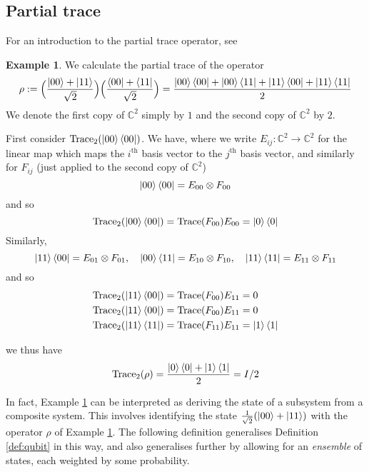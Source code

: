 \documentclass[12pt]{article}
\theoremstyle{plain}
\theoremstyle{definition}
\newtheorem{example}[thm]{Example}
\newcommand{\bb}[1]{\mathbb{#1}}
\newcommand{\lto}{\longrightarrow}
\begin{document}
	\subsection{Partial trace}
	For an introduction to the partial trace operator, see \cite{CommutativeAlgebra}
	\begin{example}\label{ex:Bell_operator}
		We calculate the partial trace of the operator
		\begin{equation}
			\rho := \Big(\frac{\ket{00} + \ket{11}}{\sqrt{2}}\Big)\Big(\frac{\bra{00} + \bra{11}}{\sqrt{2}}\Big) = \frac{\ket{00}\bra{00} + \ket{00}\bra{11} + \ket{11}\bra{00} + \ket{11}\bra{11}}{2}
		\end{equation}
		We denote the first copy of $\bb{C}^2$ simply by $1$ and the second copy of $\bb{C}^2$ by $2$.
		
		First consider $\operatorname{Trace}_2(\ket{00}\bra{00})$. We have, where we write $E_{ij}: \bb{C}^2 \lto \bb{C}^2$ for the linear map which maps the $i^{\text{th}}$ basis vector to the $j^{\text{th}}$ basis vector, and similarly for $F_{ij}$ (just applied to the second copy of $\bb{C}^2$)
		\begin{equation}
			\ket{00}\bra{00} = E_{00} \otimes F_{00}
		\end{equation}
		and so
		\begin{equation}
			\operatorname{Trace}_2(\ket{00}\bra{00}) = \operatorname{Trace}(F_{00})E_{00} = \ket{0}\bra{0}
		\end{equation}
		Similarly,
		\begin{equation}
			\ket{11}\bra{00} = E_{01}\otimes F_{01},\quad \ket{00}\bra{11} = E_{10} \otimes F_{10},\quad \ket{11}\bra{11} = E_{11} \otimes F_{11}
		\end{equation}
		and so
		\begin{align}
			\operatorname{Trace}_2(\ket{11}\bra{00}) = \operatorname{Trace}(F_{00})E_{11} &= 0\\
			\operatorname{Trace}_2(\ket{11}\bra{00}) = \operatorname{Trace}(F_{00})E_{11} &= 0\\
			\operatorname{Trace}_2(\ket{11}\bra{11}) = \operatorname{Trace}(F_{11})E_{11} &= \ket{1}\bra{1}
		\end{align}
	\end{example}
	we thus have
	\begin{equation}\label{eq:partial_trace_ex}
		\operatorname{Trace}_2(\rho) = \frac{\ket{0}\bra{0} + \ket{1}\bra{1}}{2} = I/2
	\end{equation}

In fact, Example \ref{ex:Bell_operator} can be interpreted as deriving the state of a subsystem from a composite system. This involves identifying the state $\frac{1}{\sqrt{2}}(\ket{00} + \ket{11})$ with the operator $\rho$ of Example \ref{ex:Bell_operator}. The following definition generalises Definition \ref{def:qubit} in this way, and also generalises further by allowing for an \emph{ensemble} of states, each weighted by some probability.
\end{document}
